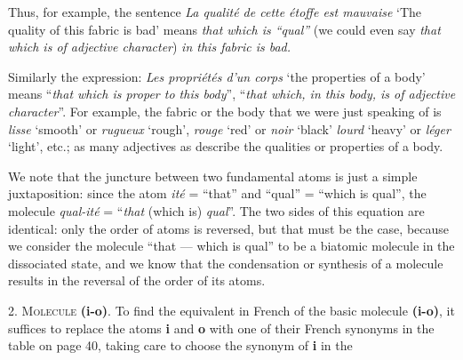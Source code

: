 \begin{sloppypar}
{  } %
  {\noindent Thus, for example, the sentence \emph{La qualité de cette
    étoffe est mauvaise} `The quality of this fabric is bad' means
    \emph{that which is ``qual''} (we could even say \emph{that which
      is of adjective character}) \emph{in this fabric is bad.}

    Similarly the expression: \emph{Les propriétés d'un corps} `the
    properties of a body' means ``\emph{that which is proper to this
      body}'', ``\emph{that which, in this body, is of adjective
      character}''. For example, the fabric or the body that we were
    just speaking of is \emph{lisse} `smooth' or \emph{rugueux}
    `rough', \emph{rouge} `red' or \emph{noir} `black' \emph{lourd}
    `heavy' or \emph{léger} `light', etc.; as many adjectives as
    describe the qualities or properties of a body.

    We note that the juncture between two fundamental atoms is just a
    simple juxtaposition: since the atom \emph{ité} = ``that'' and
    ``qual'' = ``which is qual'', the molecule \emph{qual-ité} =
    ``\emph{that} (which is) \emph{qual}''. The two sides of this
    equation are identical: only the order of atoms is reversed, but
    that must be the case, because we consider the molecule ``that ---
    which is qual'' to be a biatomic molecule in the dissociated
    state, and we know that the condensation or synthesis of a
    molecule results in the reversal of the order of its atoms.

    2. \textsc{Molecule} \textbf{(i-o)}. To find the equivalent in
    French of the basic molecule \textbf{(i-o)}, it suffices to
    replace the atoms \textbf{i} and \textbf{o} with one of their French
    synonyms in the table on page 40, taking care to choose the
    synonym of \textbf{i} in the }

\end{sloppypar}
